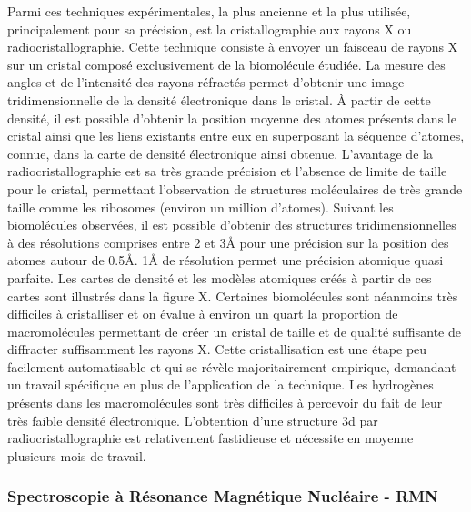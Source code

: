 Parmi ces techniques expérimentales, la plus ancienne et la plus utilisée, principalement pour sa précision, est la cristallographie aux rayons X ou radiocristallographie. Cette technique consiste à envoyer un faisceau de rayons X sur un cristal composé exclusivement de la biomolécule étudiée. La mesure des angles et de l'intensité des rayons réfractés permet d'obtenir une image tridimensionnelle de la densité électronique dans le cristal. À partir de cette densité, il est possible d'obtenir la position moyenne des atomes présents dans le cristal ainsi que les liens existants entre eux en superposant la séquence d'atomes, connue, dans la carte de densité électronique ainsi obtenue. 
L'avantage de la radiocristallographie est sa très grande précision et l'absence de limite de taille pour le cristal, permettant l'observation de structures moléculaires de très grande taille comme les ribosomes (environ un million d'atomes). Suivant les biomolécules observées, il est possible d'obtenir des structures tridimensionnelles à des résolutions comprises entre 2 et 3\r{A} pour une précision sur la position des atomes autour de 0.5\r{A}. 1\r{A} de résolution permet une précision atomique quasi parfaite. Les cartes de densité et les modèles atomiques créés à partir de ces cartes sont illustrés dans la figure X. 
Certaines biomolécules sont néanmoins très difficiles à cristalliser et on évalue à environ un quart la proportion de macromolécules permettant de créer un cristal de taille et de qualité suffisante de diffracter suffisamment les rayons X. Cette cristallisation est une étape peu facilement automatisable et qui se révèle majoritairement empirique, demandant un travail spécifique en plus de l'application de la technique. Les hydrogènes présents dans les macromolécules sont très difficiles à percevoir du fait de leur très faible densité électronique. L'obtention d'une structure 3d par radiocristallographie est relativement fastidieuse et nécessite en moyenne plusieurs mois de travail.

\subsubsection{Spectroscopie à Résonance Magnétique Nucléaire - RMN}

